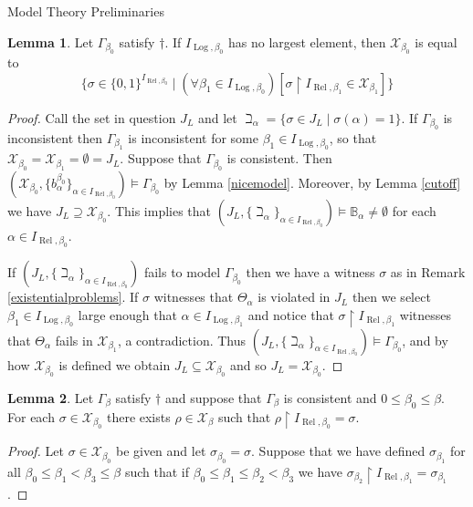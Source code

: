\documentclass{amsart}
\theoremstyle{definition}\newtheorem{theorem}{Theorem}
\theoremstyle{definition}\newtheorem{bigtheorem}{Theorem}
\numberwithin{theorem}{section}
\theoremstyle{definition}\newtheorem{corollary}[theorem]{Corollary}
\theoremstyle{definition}\newtheorem{proposition}[theorem]{Proposition}
\theoremstyle{definition}\newtheorem{definition}[theorem]{Definition}
\theoremstyle{definition}\newtheorem{question}[theorem]{Question}
\theoremstyle{definition}\newtheorem{example}[theorem]{Example}
\theoremstyle{definition}\newtheorem{remark}[theorem]{Remark}
\theoremstyle{definition}\newtheorem{note}[theorem]{Note}
\theoremstyle{definition}\newtheorem{lemma}[theorem]{Lemma}
\theoremstyle{definition}\newtheorem{fact}[theorem]{Fact}
\theoremstyle{definition}\newtheorem{define}[theorem]{Definition}
\theoremstyle{definition}\newtheorem{definitions}[theorem]{Definitions}
\theoremstyle{definition}\newtheorem{claim}[theorem]{Claim}
\theoremstyle{definition}\newtheorem{obs}[theorem]{Observation}
\theoremstyle{definition}\newtheorem{construction}[theorem]{Construction}
\newcommand{\B}{\mathbb{B}}
\newcommand{\Rel}{\operatorname{Rel}}
\newcommand{\Log}{\operatorname{Log}}
\newcommand{\X}{\mathcal{X}}
\begin{document}
\begin{section}{Model Theory Preliminaries}
\begin{lemma}\label{limitstage}  Let $\Gamma_{\beta_0}$ satisfy $\dagger$.  If $I_{\Log, \beta_0}$ has no largest element, then $\X_{\beta_0}$ is equal to $$\{\sigma \in  \{0, 1\}^{I_{\Rel, \beta_0}} \mid (\forall \beta_1 \in I_{\Log, \beta_0})[\sigma \upharpoonright I_{\Rel, \beta_1} \in \X_{\beta_1}]\}$$
\end{lemma}

\begin{proof}  Call the set in question $J_L$ and let $\beth_{\alpha} = \{\sigma \in J_L \mid \sigma(\alpha) = 1\}$.  If $\Gamma_{\beta_0}$ is inconsistent then $\Gamma_{\beta_1}$ is inconsistent for some $\beta_1 \in I_{\Log, \beta_0}$, so that $\X_{\beta_0} = \X_{\beta_1} = \emptyset = J_L$.  Suppose that $\Gamma_{\beta_0}$ is consistent.  Then $(\X_{\beta_0}, \{b_{\alpha}^{\beta_0}\}_{\alpha \in I_{\Rel, \beta_0}}) \models \Gamma_{\beta_0}$ by Lemma \ref{nicemodel}.  Moreover, by Lemma \ref{cutoff} we have $J_L \supseteq \X_{\beta_0}$.  This implies that $(J_L, \{\beth_{\alpha}\}_{\alpha \in I_{\Rel, \beta_0}}) \models \B_{\alpha} \neq \emptyset$ for each $\alpha \in I_{\Rel, \beta_0}$.

If $(J_L, \{\beth_{\alpha}\}_{\alpha \in I_{\Rel, \beta_0}})$ fails to model $\Gamma_{\beta_0}$ then we have a witness $\sigma$ as in  Remark \ref{existentialproblems}.  If $\sigma$ witnesses that $\Theta_{\alpha}$ is violated in $J_L$ then we select $\beta_1 \in I_{\Log, \beta_0}$ large enough that $\alpha \in I_{\Log, \beta_1}$ and notice that $\sigma\upharpoonright I_{\Rel, \beta_1}$ witnesses that $\Theta_{\alpha}$ fails in $\X_{\beta_1}$, a contradiction.  Thus $(J_L, \{\beth_{\alpha}\}_{\alpha \in I_{\Rel, \beta_0}}) \models \Gamma_{\beta_0}$, and by how $\X_{\beta_0}$ is defined we obtain $J_L \subseteq \X_{\beta_0}$ and so $J_L = \X_{\beta_0}$.
\end{proof}


\begin{lemma}\label{extension}  Let $\Gamma_{\beta}$ satisfy $\dagger$ and suppose that $\Gamma_{\beta}$ is consistent and $0 \leq \beta_0 \leq \beta$.  For each $\sigma \in \X_{\beta_0}$ there exists $\rho \in \X_{\beta}$ such that $\rho \upharpoonright I_{\Rel, \beta_0} = \sigma$.  
\end{lemma}

\begin{proof}  Let $\sigma \in \X_{\beta_0}$ be given and let $\sigma_{\beta_0} = \sigma$.  Suppose that we have defined $\sigma_{\beta_1}$ for all $\beta_0 \leq \beta_1 <\beta_3 \leq \beta$ such that if $\beta_0 \leq \beta_1 \leq \beta_2 < \beta_3$ we have $\sigma_{\beta_2} \upharpoonright I_{\Rel, \beta_1} = \sigma_{\beta_1}$.



\end{proof}
\end{section}
\end{document}
